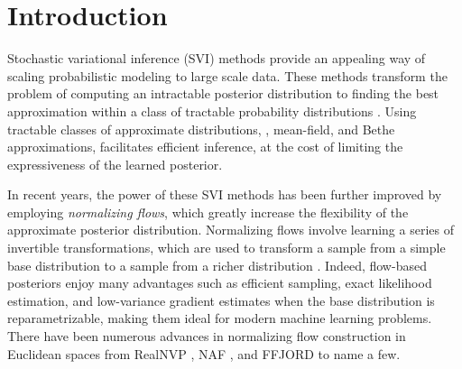 \section{Introduction}
Stochastic variational inference (SVI) methods provide an appealing way of scaling probabilistic modeling to large scale data.
These methods transform the problem of computing an intractable posterior distribution to finding the best approximation within a class of tractable probability distributions \cite{hoffman2013stochastic}.
Using tractable classes of approximate distributions, \eg, mean-field, and Bethe approximations, facilitates efficient inference, at the cost of limiting the expressiveness of the learned posterior. 

In recent years, the power of these SVI methods has been further improved by employing {\em normalizing flows}, which greatly increase the flexibility of the approximate posterior distribution. 
Normalizing flows involve learning a series of invertible transformations, which are used to transform a sample from a simple base distribution to a sample from a richer distribution \cite{rezende2015variational}. 
Indeed, flow-based posteriors enjoy many advantages such as efficient sampling, exact likelihood estimation, and low-variance gradient estimates when the base distribution is reparametrizable, making them ideal for modern machine learning problems.
There have been numerous advances in normalizing flow construction in Euclidean spaces from RealNVP \cite{dinh2016density}, NAF \cite{huang2018neural}, and FFJORD \cite{grathwohl2018ffjord} to name a few.

